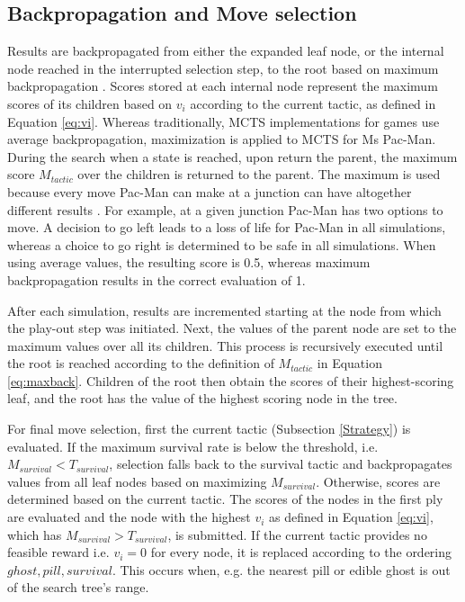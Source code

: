 \documentclass[journal]{IEEEtran}
\begin{document}
\subsection{Backpropagation and Move selection \label{sec:bpms}}

Results are backpropagated from either the expanded leaf node, or the internal node reached in the interrupted selection step, to the root based on maximum backpropagation \cite{coulom2007efficient}. Scores stored at each internal node represent the maximum scores of its children based on $v_i$ according to the current tactic, as defined in Equation \ref{eq:vi}. Whereas traditionally, MCTS implementations for games use average backpropagation, maximization is applied to MCTS for Ms Pac-Man. During the search when a state is reached, upon return the parent, the maximum score $M_{tactic}$ over the children is returned to the parent. The maximum is used because every move Pac-Man can make at a junction can have altogether different results \cite{ikehata2011monte}. For example, at a given junction Pac-Man has two options to move. A decision to go left leads to a loss of life for Pac-Man in all simulations, whereas a choice to go right is determined to be safe in all simulations. When using average values, the resulting score is 0.5, whereas maximum backpropagation results in the correct evaluation of 1. 

After each simulation, results are incremented starting at the node from which the play-out step was initiated. Next, the values of the parent node are set to the maximum values over all its children. This process is recursively executed until the root is reached according to the definition of $M_{tactic}$ in Equation \ref{eq:maxback}. Children of the root then obtain the scores of their highest-scoring leaf, and the root has the value of the highest scoring node in the tree.

For final move selection, first the current tactic (Subsection \ref{Strategy}) is evaluated. If the maximum survival rate is below the threshold, i.e. ${M}_{survival} < T_{survival}$, selection falls back to the survival tactic and backpropagates values from all leaf nodes based on maximizing ${M}_{survival}$. Otherwise, scores are determined based on the current tactic. The scores of the nodes in the first ply are evaluated and the node with the highest $v_i$ as defined in Equation \ref{eq:vi}, which has ${M}_{survival} > T_{survival}$, is submitted. If the current tactic provides no feasible reward i.e. $v_i = 0$ for every node, it is replaced according to the ordering $ghost, pill, survival$. This occurs when, e.g. the nearest pill or edible ghost is out of the search tree's range.
\end{document}
